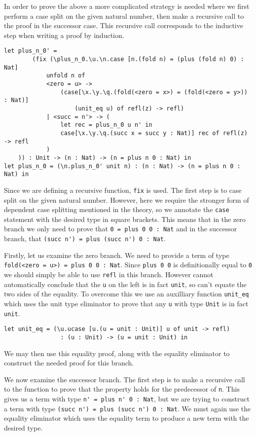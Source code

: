 \documentclass[12pt,a4paper,twoside]{report}
\begin{document}
In order to prove the above a more complicated strategy is needed where we first perform a case split on the given natural number, then make a recursive call to the proof in the successor case.
This recursive call corresponds to the inductive step when writing a proof by induction.
\begin{lstlisting}[gobble=4]
    let plus_n_0' =
        (fix (\plus_n_0.\u.\n.case [n.(fold n) = (plus (fold n) 0) : Nat]
            unfold n of
            <zero = u> -> 
                (case[\x.\y.\q.(fold(<zero = x>) = (fold(<zero = y>)) : Nat)]
                    (unit_eq u) of refl(z) -> refl)
            | <succ = n'> -> (
                let rec = plus_n_0 u n' in
                case[\x.\y.\q.(succ x = succ y : Nat)] rec of refl(z) -> refl
            )
    )) : Unit -> (n : Nat) -> (n = plus n 0 : Nat) in
let plus_n_0 = (\n.plus_n_0' unit n) : (n : Nat) -> (n = plus n 0 : Nat) in
\end{lstlisting}
Since we are defining a recursive function, \texttt{fix} is used.
The first step is to case split on the given natural number.
However, here we require the stronger form of dependent case splitting mentioned in the theory, so we annotate the \texttt{case} statement with the desired type in square brackets.
This means that in the zero branch we only need to prove that \lstinline{0 = plus 0 0 : Nat} and in the successor branch, that \lstinline{(succ n') = plus (succ n') 0 : Nat}.

Firstly, let us examine the zero branch.
We need to provide a term of type \lstinline{fold(<zero = u>) = plus 0 0 : Nat}.
Since \lstinline{plus 0 0} is definitionally equal to \lstinline{0} we should simply be able to use \lstinline{refl} in this branch.
However \pimu{} cannot automatically conclude that the \lstinline{u} on the left is in fact \lstinline{unit}, so can't equate the two sides of the equality.
To overcome this we use an auxilliary function \lstinline{unit_eq} which uses the unit type eliminator to prove that any \lstinline{u} with type \lstinline{Unit} is in fact \lstinline{unit}.
\begin{lstlisting}[gobble=4]
    let unit_eq = (\u.ucase [u.(u = unit : Unit)] u of unit -> refl)
                : (u : Unit) -> (u = unit : Unit) in
\end{lstlisting}
We may then use this equality proof, along with the equality eliminator to construct the needed proof for this branch.

We now examine the successor branch.
The first step is to make a recursive call to the function to prove that the property holds for the predecessor of \lstinline{n}.
This gives us a term with type \lstinline{n' = plus n' 0 : Nat}, but we are trying to construct a term with type \lstinline{(succ n') = plus (succ n') 0 : Nat}.
We must again use the equality eliminator which uses the equality term to produce a new term with the desired type.
\end{document}
